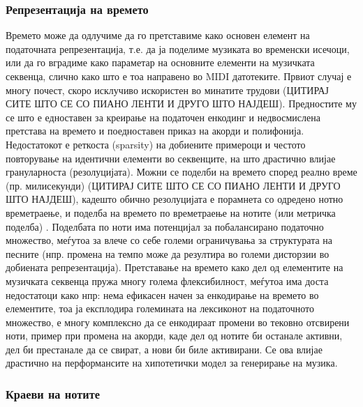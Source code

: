 \subsubsection{Репрезентација на времето}

Времето може да одлучиме да го претставиме како основен елемент на податочната репрезентација, т.е. да ја поделиме музиката во временски исечоци, или да го вградиме како параметар на основните елементи на музичката секвенца, слично како што е тоа направено во MIDI датотеките. Првиот случај е многу почест, скоро исклучиво искористен во минатите трудови (ЦИТИРАЈ СИТЕ ШТО СЕ СО ПИАНО ЛЕНТИ И ДРУГО ШТО НАЈДЕШ). Предностите му се што е едноставен за креирање на податочен енкодинг и недвосмислена претстава на времето и поедноставен приказ на акорди и полифонија. Недостатокот е реткоста (sparsity) на добиените примероци и честото повторување на идентични елементи во секвенците, на што драстично влијае грануларноста (резолуцијата). Можни се поделби на времето според реално време (пр. милисекунди) (ЦИТИРАЈ СИТЕ ШТО СЕ СО ПИАНО ЛЕНТИ И ДРУГО ШТО НАЈДЕШ), кадешто обично резолуцијата е порамнета со одредено нотно времетраење, и поделба на времето по времетраење на нотите (или метричка поделба) \cite{Walder2016}. Поделбата по ноти има потенцијал за побалансирано податочно множество, меѓутоа за влече со себе големи ограничувања за структурата на песните (нпр. промена на темпо може да резултира во големи дисторзии во добиената репрезентација).
Претставање на времето како дел од елементите на музичката секвенца пружа многу голема флексибилност, меѓутоа има доста недостатоци како нпр: нема ефикасен начен за енкодирање на времето во елементите, тоа ја експлодира големината на лексиконот на податочното множество, е многу комплексно да се енкодираат промени во тековно отсвирени ноти, пример при промена на акорди, каде дел од нотите би останале активни, дел би престанале да се свират, а нови би биле активирани. Се ова влијае драстично на перформансите на хипотетички модел за генерирање на музика.

\subsubsection{Краеви на нотите}

